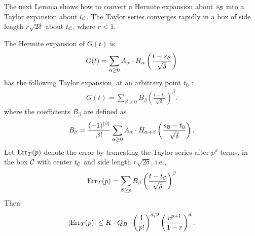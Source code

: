 The next Lemma shows how to convert a Hermite expansion about $s_{\cal B}$ into a Taylor expansion about $t_{\cal C}$. The Taylor series converges rapidly in a box of side length $r \sqrt{2 \delta}$ about $t_{\cal C}$, where $r < 1$.
\begin{lemma}\label{lem:fast_gaussian_lemma_2}
The Hermite expansion of $G(t)$ is
\begin{align*}
G(t) = \sum_{\alpha \geq 0} A_{\alpha} \cdot H_{\alpha} \left( \frac{ t - s_{\cal B} }{ \sqrt{\delta} } \right)
\end{align*}
has the following Taylor expansion, at an arbitrary point $t_0$ :
\begin{align}\label{eq:taylor_expansion_of_G_t}
G(t) = \sum_{\beta \geq 0} B_{\beta} \left( \frac{ t - t_0 }{ \sqrt{\delta} } \right)^{\beta} .
\end{align}
where the coefficients $B_{\beta}$ are defined as 
\begin{align}\label{eq:def_B_beta}
B_{\beta} = \frac{ (-1)^{ | \beta | } }{ \beta ! } \sum_{\alpha \geq 0} A_{\alpha} \cdot H_{\alpha + \beta} \left( \frac{ s_{\cal B} - t_0 }{ \sqrt{\delta} } \right).
\end{align}
Let $\mathrm{Err}_T(p)$ denote the error by truncating the Taylor series after $p^d$ terms, in the box ${\cal C}$ with center $t_{\cal C}$ and side length $r \sqrt{2\delta}$, i.e.,
\begin{align*}
\mathrm{Err}_T(p) = \sum_{\beta \geq p} B_{\beta} \left( \frac{ t - t_{\cal C} }{ \sqrt{\delta} } \right)^{\beta}
\end{align*}
Then 
\begin{align*} 
| \mathrm{Err}_T(p) | \leq K \cdot Q_B \cdot \left( \frac{1}{p!} \right)^{d/2} \left( \frac{ r^{p+1} }{1-r} \right)^d .
\end{align*}
\end{lemma}
